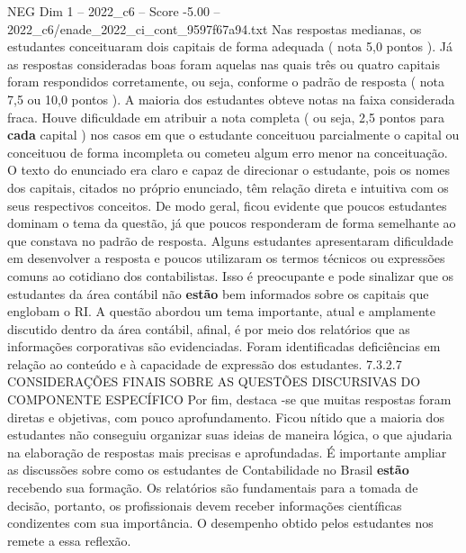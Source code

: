 \begin{textsample}{NEG Dim 1 – 2022\_c6 – Score -5.00 – 2022\_c6/enade\_2022\_ci\_cont\_9597f67a94.txt}
Nas respostas medianas, os estudantes conceituaram dois capitais de forma adequada ( nota 5,0 pontos ).
Já as respostas consideradas boas foram aquelas nas quais três ou quatro capitais foram respondidos corretamente, ou seja, conforme o padrão de resposta ( nota 7,5 ou 10,0 pontos ).
A maioria dos estudantes obteve notas na faixa considerada fraca.
Houve dificuldade em atribuir a nota completa ( ou seja, 2,5 pontos para \textbf{cada} capital ) nos casos em que o estudante conceituou parcialmente o capital ou conceituou de forma incompleta ou cometeu algum erro menor na conceituação.
O texto do enunciado era claro e capaz de direcionar o estudante, pois os nomes dos capitais, citados no próprio enunciado, têm relação direta e intuitiva com os seus respectivos conceitos.
De modo geral, ficou evidente que poucos estudantes dominam o tema da questão, já que poucos responderam de forma semelhante ao que constava no padrão de resposta.
Alguns estudantes apresentaram dificuldade em desenvolver a resposta e poucos utilizaram os termos técnicos ou expressões comuns ao cotidiano dos contabilistas.
Isso é preocupante e pode sinalizar que os estudantes da área contábil não \textbf{estão} bem informados sobre os capitais que englobam o RI.
A questão abordou um tema importante, atual e amplamente discutido dentro da área contábil, afinal, é por meio dos relatórios que as informações corporativas são evidenciadas.
Foram identificadas deficiências em relação ao conteúdo e à capacidade de expressão dos estudantes. 7.3.2.7 CONSIDERAÇÕES FINAIS SOBRE AS QUESTÕES DISCURSIVAS DO COMPONENTE ESPECÍFICO Por fim, destaca -se que muitas respostas foram diretas e objetivas, com pouco aprofundamento.
Ficou nítido que a maioria dos estudantes não conseguiu organizar suas ideias de maneira lógica, o que ajudaria na elaboração de respostas mais precisas e aprofundadas.
É importante ampliar as discussões sobre como os estudantes de Contabilidade no Brasil \textbf{estão} recebendo sua formação.
Os relatórios são fundamentais para a tomada de decisão, portanto, os profissionais devem receber informações científicas condizentes com sua importância.
O desempenho obtido pelos estudantes nos remete a essa reflexão.

\end{textsample}
